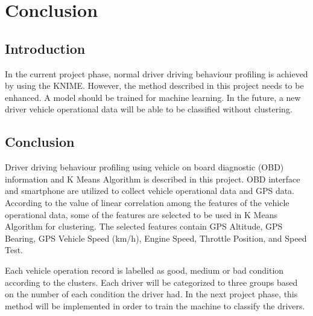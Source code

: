 \chapter{Conclusion}
\section{Introduction}
In the current project phase, normal driver driving behaviour profiling is achieved by using the KNIME. However, the method described in this project needs to be enhanced. A model should be trained for machine learning. In the future, a new driver vehicle operational data will be able to be classified without clustering. 

\section{Conclusion}

Driver driving behaviour profiling using vehicle on board diagnostic (OBD) information and K Means Algorithm is described in this project. OBD interface and smartphone are utilized to collect vehicle operational data and GPS data. According to the value of linear correlation among the features of the vehicle operational data, some of the features are selected to be used in K Means Algorithm for clustering. The selected features contain GPS Altitude, GPS Bearing, GPS Vehicle Speed (km/h), Engine Speed, Throttle Position, and Speed Test. 

Each vehicle operation record is labelled as good, medium or bad condition according to the clusters. Each driver will be categorized to three groups based on the number of each condition the driver had. In the next project phase, this method will be implemented in order to train the machine to classify the drivers.
